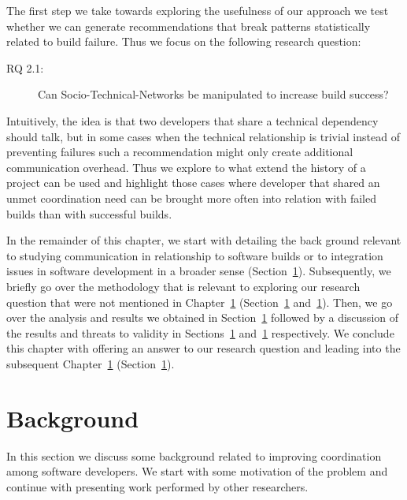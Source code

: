 \label{chap:stc-net}
The first step we take towards exploring the usefulness of our approach we test whether we can generate recommendations that break patterns statistically related to build failure.
Thus we focus on the following research question:

\begin{description}
  \item[RQ 2.1:] Can Socio-Technical-Networks be manipulated to increase build success? 
\end{description}

Intuitively, the idea is that two developers that share a technical dependency should talk, but in some cases when the technical relationship is trivial instead of preventing failures such a recommendation might only create additional communication overhead.
Thus we explore to what extend the history of a project can be used and highlight those cases where developer that shared an unmet coordination need can be brought more often into relation with failed builds than with successful builds.

In the remainder of this chapter, we start with detailing the back ground relevant to studying communication in relationship to software builds or to integration issues in software development in a broader sense (Section~\ref{}).
Subsequently, we briefly go over the methodology that is relevant to exploring our research question that were not mentioned in Chapter~\ref{} (Section~\ref{} and~\ref{}).
Then, we go over the analysis and results we obtained in Section~\ref{} followed by a discussion of the results and threats to validity in Sections~\ref{} and~\ref{} respectively.
We conclude this chapter with offering an answer to our research question and leading into the subsequent Chapter~\ref{} (Section~\ref{}).

\section{Background}
In this section we discuss some background related to improving coordination among software developers.
We start with some motivation of the problem and continue with presenting work performed by other researchers.

